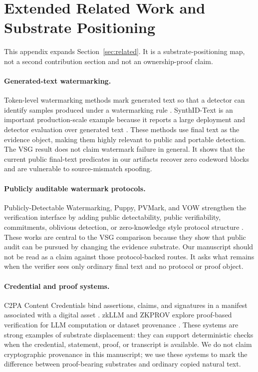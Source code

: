 \section{Extended Related Work and Substrate Positioning}
\label{app:extended-related}

This appendix expands Section~\ref{sec:related}.  It is a substrate-positioning
map, not a second contribution section and not an ownership-proof claim.

\paragraph{Generated-text watermarking.}
Token-level watermarking methods mark generated text so that a detector can
identify samples produced under a watermarking rule
\cite{kirchenbauer2023watermark,zhao2023provable,hu2024unbiased,kuditipudi2024robust,christ2023undetectable,lee2024who,chang2024postmark,huang2025waterpool,dabiriaghdam2025simmark,wouters2024optimizing,liu2024adaptive,zhu2024duwak,lau2024waterfall,jiang2025stealthink}.
SynthID-Text is an important production-scale example because it reports a
large deployment and detector evaluation over generated text
\cite{dathathri2024scalable}.  These methods use final text as the evidence
object, making them highly relevant to public and portable detection.  The VSG
result does not claim watermark failure in general.  It shows that the current
public final-text predicates in our artifacts recover zero codeword blocks and
are vulnerable to source-mismatch spoofing.

\paragraph{Publicly auditable watermark protocols.}
Publicly-Detectable Watermarking, Puppy, PVMark, and VOW strengthen the
verification interface by adding public detectability, public verifiability,
commitments, oblivious detection, or zero-knowledge style protocol structure
\cite{fairoze2023publicly,isler2023puppy,duan2025pvmark,luan2026vow}.  These
works are central to the VSG comparison because they show that public audit can
be pursued by changing the evidence substrate.  Our manuscript should not be
read as a claim against those protocol-backed routes.  It asks what remains
when the verifier sees only ordinary final text and no protocol or proof object.

\paragraph{Credential and proof systems.}
C2PA Content Credentials bind assertions, claims, and signatures in a manifest
associated with a digital asset \cite{c2pa2025spec}.  zkLLM and ZKPROV explore
proof-based verification for LLM computation or dataset provenance
\cite{sun2024zkllm,namazi2025zkprov}.  These systems are strong examples of
substrate displacement: they can support deterministic checks when the
credential, statement, proof, or transcript is available.  We do not claim
cryptographic provenance in this manuscript; we use these systems to mark the
difference between proof-bearing substrates and ordinary copied natural text.

